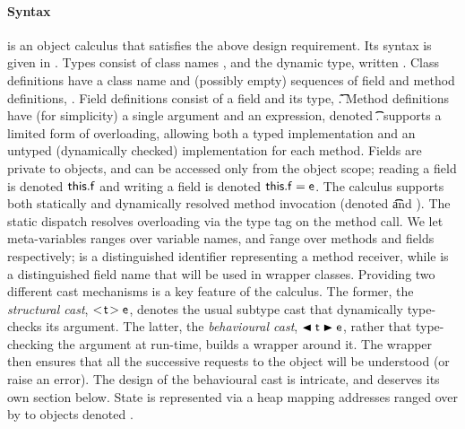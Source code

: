 \documentclass[acmlarge, anonymous, authordraft]{acmart}
\begin{document}
\paragraph{Syntax}  
\kafka is an object calculus that satisfies the above design
requirement. Its syntax is given in .  Types consist of class
names \C, \D and the dynamic type, written \any.  Class definitions have a
class name and (possibly empty) sequences of field and method definitions,
\Class{}. Field definitions consist of a field and its
type, \Fdef\f\t. Method definitions have (for simplicity) a single argument
and an expression, denoted \Mdef\m\x\t\t\e.  \kafka supports a limited form
of overloading, allowing both a typed implementation and an untyped
(dynamically checked) implementation for each method.  Fields are private to
objects, and can be accessed only from the object scope; reading a field is
denoted \({\sf{this}}.{\sf{f}}\) and writing a field is denoted \({\sf{this}}.{\sf{f}} = {\sf{e}} \).  The
calculus supports both statically and dynamically resolved method invocation
(denoted \KCall\e\m\e\t\t and \DynCall\e\m\e).  The static dispatch resolves
overloading via the type tag on the method call.  We let meta-variables \x
ranges over variable names, \m and \f range over methods and fields
respectively; \this is a distinguished identifier representing a method
receiver, while \that is a distinguished field name that will be used in
wrapper classes.  Providing two different cast mechanisms is a key feature
of the calculus.  The former, the \emph{structural cast}, \(\SubCast\t\e\),
denotes the usual subtype cast that dynamically type-checks its argument.
The latter, the \emph{behavioural cast}, \(\BehCast\t\e\), rather that
type-checking the argument at run-time, builds a wrapper around it.  The
wrapper then ensures that all the successive requests to the object will be
understood (or raise an error). The design of the behavioural cast is
intricate, and deserves its own section below.
State is represented via a heap \s mapping addresses ranged over by \a
to objects denoted \hspace{-1mm}\obj{}.
\end{document}
